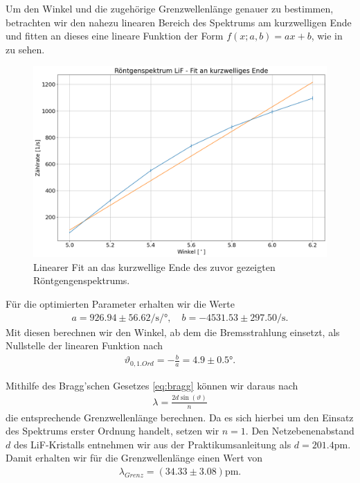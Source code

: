 Um den Winkel und die zugehörige Grenzwellenlänge genauer zu bestimmen, betrachten wir den nahezu linearen Bereich des Spektrums am kurzwelligen Ende und fitten an dieses eine lineare Funktion der Form $f(x;a,b) = ax + b$, wie in  zu sehen.

\begin{figure}[H]
  \centering
  \includegraphics[width=.9\textwidth]{files/plots/spektrum_lif_linear_fit.png}
  \caption{Linearer Fit an das kurzwellige Ende des zuvor gezeigten Röntgengenspektrums.}
  \label{fig:spektrum_lif_linear_fit}
\end{figure}

Für die optimierten Parameter erhalten wir die Werte
\begin{align}
  a = 926.94 \pm 56.62 \si{\per\second\per\degree},\quad
  b = -4531.53 \pm 297.50 \si{\per\second}.
\end{align}
Mit diesen berechnen wir den Winkel, ab dem die Bremsstrahlung einsetzt, als Nullstelle der linearen Funktion nach
\begin{align}
  \vartheta_{0,1. Ord} = -\frac{b}{a} = 4.9 \pm 0.5 \si{\degree}.
\end{align}

Mithilfe des Bragg'schen Gesetzes \eqref{eq:bragg} können wir daraus nach
\begin{align}
  \lambda = \frac{2d\sin(\vartheta)}{n}
\end{align}
die entsprechende Grenzwellenlänge berechnen. Da es sich hierbei um den Einsatz des Spektrums erster Ordnung handelt, setzen wir $n = 1$. Den Netzebenenabstand $d$ des LiF-Kristalls entnehmen wir aus der Praktikumsanleitung als $d = 201.4\si{\pico\meter}$. Damit erhalten wir für die Grenzwellenlänge einen Wert von
\begin{align}
  \lambda_{Grenz} = (34.33 \pm 3.08) \si{\pico\meter}.
\end{align}

